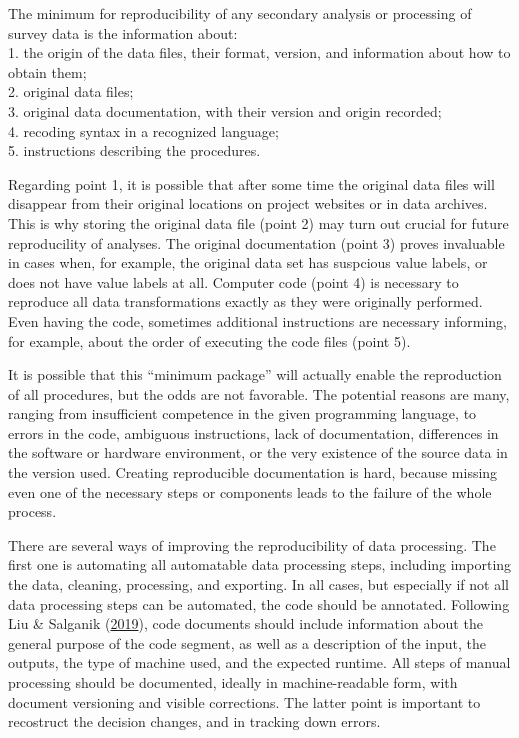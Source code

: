 \documentclass[12pt,]{article}
\begin{document}
The minimum for reproducibility of any secondary analysis or processing of survey data is the information about:\\
1. the origin of the data files, their format, version, and information about how to obtain them;\\
2. original data files;\\
3. original data documentation, with their version and origin recorded;\\
4. recoding syntax in a recognized language;\\
5. instructions describing the procedures.

Regarding point 1, it is possible that after some time the original data files will disappear from their original locations on project websites or in data archives. This is why storing the original data file (point 2) may turn out crucial for future reproducility of analyses. The original documentation (point 3) proves invaluable in cases when, for example, the original data set has suspcious value labels, or does not have value labels at all. Computer code (point 4) is necessary to reproduce all data transformations exactly as they were originally performed. Even having the code, sometimes additional instructions are necessary informing, for example, about the order of executing the code files (point 5).

It is possible that this ``minimum package'' will actually enable the reproduction of all procedures, but the odds are not favorable. The potential reasons are many, ranging from insufficient competence in the given programming language, to errors in the code, ambiguous instructions, lack of documentation, differences in the software or hardware environment, or the very existence of the source data in the version used. Creating reproducible documentation is hard, because missing even one of the necessary steps or components leads to the failure of the whole process.

There are several ways of improving the reproducibility of data processing. The first one is automating all automatable data processing steps, including importing the data, cleaning, processing, and exporting. In all cases, but especially if not all data processing steps can be automated, the code should be annotated. Following Liu \& Salganik (\protect\hyperlink{ref-Liu2019}{2019}), code documents should include information about the general purpose of the code segment, as well as a description of the input, the outputs, the type of machine used, and the expected runtime. All steps of manual processing should be documented, ideally in machine-readable form, with document versioning and visible corrections. The latter point is important to recostruct the decision changes, and in tracking down errors.
\end{document}

